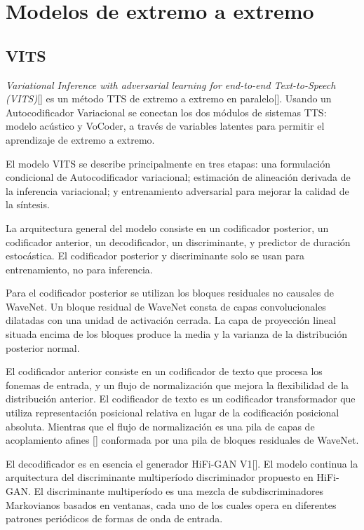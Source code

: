 \section{Modelos de extremo a extremo} \label{end-to-end}

\subsection{VITS}

\textit{Variational Inference with adversarial learning for end-to-end Text-to-Speech (VITS)}[\cite{kim2021conditional}] es un método TTS de extremo a extremo en paralelo[\cite{chen2019learning}]. Usando un Autocodificador Variacional se conectan los dos módulos de sistemas TTS: modelo acústico y VoCoder, a través de variables latentes para permitir el aprendizaje de extremo a extremo. 

El modelo VITS se describe principalmente en tres etapas: una formulación condicional de Autocodificador variacional; estimación de alineación derivada de la inferencia variacional; y entrenamiento adversarial para mejorar la calidad de la síntesis.

La arquitectura general del modelo consiste en un codificador posterior, un codificador anterior, un decodificador, un discriminante, y predictor de duración estocástica. El codificador posterior y discriminante solo se usan para entrenamiento, no para inferencia.

Para el codificador posterior se utilizan los bloques residuales no causales de WaveNet. Un bloque residual de WaveNet consta de capas convolucionales dilatadas con una unidad de activación cerrada. La capa de proyección lineal situada encima de los bloques produce la media y la varianza de la distribución posterior normal.

El codificador anterior consiste en un codificador de texto que procesa los fonemas de entrada, y un flujo de normalización que mejora la flexibilidad de la distribución anterior. El codificador de texto es un codificador transformador que utiliza representación posicional relativa en lugar de la codificación posicional absoluta. Mientras que el flujo de normalización es una pila de capas de acoplamiento afines [\cite{dinh2016density}] conformada por una pila de bloques residuales de WaveNet. 

El decodificador es en esencia el generador HiFi-GAN V1[\cite{kong2020hifi}]. El modelo continua la arquitectura del discriminante multiperíodo discriminador propuesto en HiFi-GAN. El discriminante multiperíodo es una mezcla de subdiscriminadores Markovianos basados en ventanas, cada uno de los cuales opera en diferentes patrones periódicos de formas de onda de entrada.

